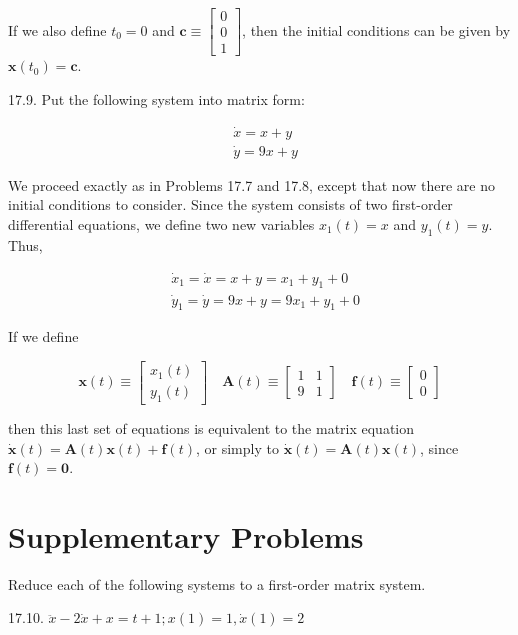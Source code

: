 \documentclass[10pt]{article}
\begin{document}
If we also define $t_{0}=0$ and $\mathbf{c} \equiv\left[\begin{array}{l}0 \\ 0 \\ 1\end{array}\right]$, then the initial conditions can be given by $\mathbf{x}\left(t_{0}\right)=\mathbf{c}$.

17.9. Put the following system into matrix form:

$$
\begin{aligned}
& \dot{x}=x+y \\
& \dot{y}=9 x+y
\end{aligned}
$$

We proceed exactly as in Problems 17.7 and 17.8, except that now there are no initial conditions to consider. Since the system consists of two first-order differential equations, we define two new variables $x_{1}(t)=x$ and $y_{1}(t)=y$. Thus,

$$
\begin{aligned}
& \dot{x}_{1}=\dot{x}=x+y=x_{1}+y_{1}+0 \\
& \dot{y}_{1}=\dot{y}=9 x+y=9 x_{1}+y_{1}+0
\end{aligned}
$$

If we define

$$
\mathbf{x}(t) \equiv\left[\begin{array}{l}
x_{1}(t) \\
y_{1}(t)
\end{array}\right] \quad \mathbf{A}(t) \equiv\left[\begin{array}{ll}
1 & 1 \\
9 & 1
\end{array}\right] \quad \mathbf{f}(t) \equiv\left[\begin{array}{l}
0 \\
0
\end{array}\right]
$$

then this last set of equations is equivalent to the matrix equation $\dot{\mathbf{x}}(t)=\mathbf{A}(t) \mathbf{x}(t)+\mathbf{f}(t)$, or simply to $\dot{\mathbf{x}}(t)=\mathbf{A}(t) \mathbf{x}(t)$, since $\mathbf{f}(t)=\mathbf{0}$.

\section*{Supplementary Problems}
Reduce each of the following systems to a first-order matrix system.

17.10. $\ddot{x}-2 \dot{x}+x=t+1 ; x(1)=1, \dot{x}(1)=2$
\end{document}
